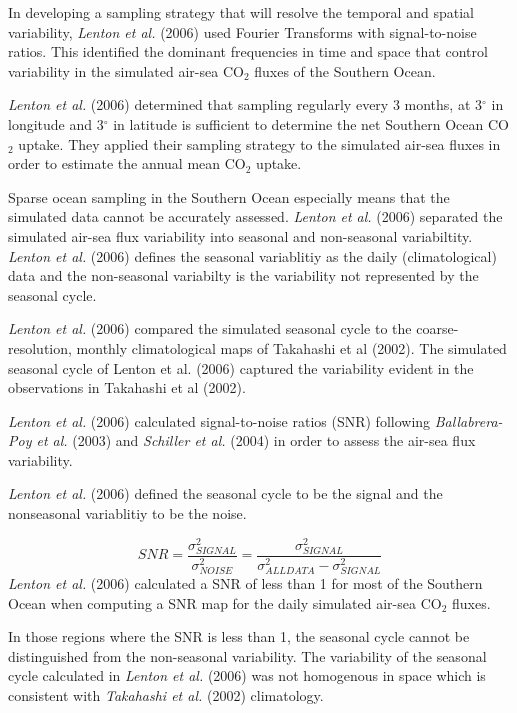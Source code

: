 \documentclass[11pt, a4paper]{article}
\numberwithin{figure}{section}
\numberwithin{table}{section}
\begin{document}
In developing a sampling strategy that will resolve the temporal and spatial variability,
\emph{Lenton et al.} (2006) used Fourier Transforms with signal-to-noise ratios. This identified
the dominant frequencies in time and space that control variability in the simulated
air-sea CO$_2$ fluxes of the Southern Ocean.

\emph{Lenton et al.} (2006) determined that sampling regularly every 3 months, 
at 3$^\circ$ in longitude and 3$^\circ$ in latitude is sufficient to determine the
net Southern Ocean CO$_2$ uptake. They applied their sampling strategy to 
the simulated air-sea fluxes in order to estimate the annual mean CO$_2$ uptake.

Sparse ocean sampling in the Southern Ocean especially means that the simulated 
data cannot be accurately assessed. \emph{Lenton et al.} (2006) separated the
simulated air-sea flux variability into seasonal and non-seasonal variabiltity.
\emph{Lenton et al.} (2006) defines the seasonal variablitiy as the daily 
(climatological) data and the non-seasonal variabilty is the variability not represented
by the seasonal cycle.

\emph{Lenton et al.} (2006) compared the simulated seasonal cycle to 
the coarse-resolution, monthly climatological maps of Takahashi et al (2002). 
The simulated seasonal 
cycle of Lenton et al. (2006) captured the variability evident in the observations
in Takahashi et al (2002).

\emph{Lenton et al.} (2006) calculated signal-to-noise ratios (SNR) following
\emph{Ballabrera-Poy et al.} (2003) and \emph{Schiller et al.} (2004) in order to assess
the air-sea flux variability. 

\emph{Lenton et al.} (2006) defined the seasonal cycle to be the signal and the 
nonseasonal variablitiy to be the noise.

\begin{equation}
SNR = \frac{\sigma^2_{SIGNAL}}{\sigma^2_{NOISE}} = 
\frac{\sigma^2_{SIGNAL}}{\sigma^2_{ALLDATA} - \sigma^2_{SIGNAL}}
\end{equation}
\newline
\emph{Lenton et al.} (2006) calculated a SNR of less than 1 for most of the Southern Ocean 
when computing a SNR map
for the daily simulated air-sea CO$_2$ fluxes.

In those regions where the SNR is less than 1, the seasonal cycle cannot be distinguished from the
non-seasonal variability. The variability of the seasonal cycle calculated in 
\emph{Lenton et al.} (2006) was not homogenous in space which is consistent with 
\emph{Takahashi et al.} (2002) climatology.
\end{document}
